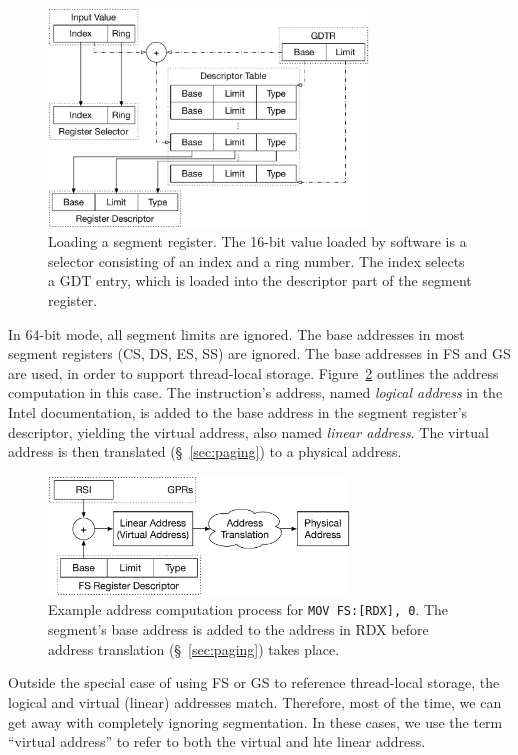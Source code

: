 \begin{figure}[hbt]
  \centering
  \includegraphics[width=85mm]{figures/cpu_segment.pdf}
  \caption{
    Loading a segment register. The 16-bit value loaded by software is a
    selector consisting of an index and a ring number. The index selects a GDT
    entry, which is loaded into the descriptor part of the segment register.
  }
  \label{fig:cpu_segment}
\end{figure}

In 64-bit mode, all segment limits are ignored. The base addresses in most
segment registers (CS, DS, ES, SS) are ignored. The base addresses in FS and GS
are used, in order to support thread-local storage.
Figure~\ref{fig:cpu_segmentation} outlines the address computation in this
case. The instruction's address, named \textit{logical address} in the Intel
documentation, is added to the base address in the segment register's
descriptor, yielding the virtual address, also named \textit{linear address}.
The virtual address is then translated (\S~\ref{sec:paging}) to a physical
address.

\begin{figure}[hbt]
  \centering
  \includegraphics[width=80mm]{figures/cpu_segmentation.pdf}
  \caption{
    Example address computation process for \texttt{MOV FS:[RDX], 0}.  The
    segment's base address is added to the address in RDX before address
    translation (\S~\ref{sec:paging}) takes place.
  }
  \label{fig:cpu_segmentation}
\end{figure}

Outside the special case of using FS or GS to reference thread-local storage,
the logical and virtual (linear) addresses match. Therefore, most of the time,
we can get away with completely ignoring segmentation. In these cases, we use
the term ``virtual address'' to refer to both the virtual and hte linear
address.

